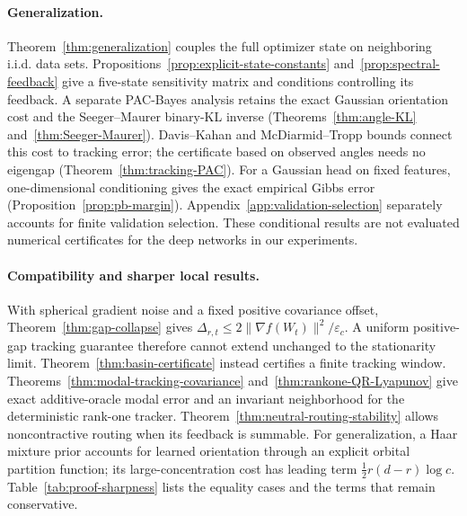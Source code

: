 \paragraph{Generalization.}
Theorem~\ref{thm:generalization} couples the full optimizer state on
neighboring i.i.d. data sets. Propositions~\ref{prop:explicit-state-constants}
and~\ref{prop:spectral-feedback} give a five-state sensitivity matrix and
conditions controlling its feedback. A separate PAC-Bayes analysis retains
the exact Gaussian orientation cost and the Seeger--Maurer binary-KL inverse
(Theorems~\ref{thm:angle-KL} and~\ref{thm:Seeger-Maurer}). Davis--Kahan and
McDiarmid--Tropp bounds connect this cost to tracking error; the certificate
based on observed angles needs no eigengap (Theorem~\ref{thm:tracking-PAC}).
For a Gaussian head on fixed features, one-dimensional conditioning gives
the exact empirical Gibbs error (Proposition~\ref{prop:pb-margin}).
Appendix~\ref{app:validation-selection} separately accounts for finite
validation selection. These conditional results are not evaluated numerical
certificates for the deep networks in our experiments.

\paragraph{Compatibility and sharper local results.}
With spherical gradient noise and a fixed positive covariance offset,
Theorem~\ref{thm:gap-collapse} gives
$\Delta_{r,t}\le2\|\nabla f(W_t)\|^2/\varepsilon_c$.
A uniform positive-gap tracking guarantee therefore cannot extend unchanged
to the stationarity limit. Theorem~\ref{thm:basin-certificate} instead
certifies a finite tracking window. Theorems~\ref{thm:modal-tracking-covariance}
and~\ref{thm:rankone-QR-Lyapunov} give exact additive-oracle modal error and
an invariant neighborhood for the deterministic rank-one tracker.
Theorem~\ref{thm:neutral-routing-stability} allows noncontractive routing
when its feedback is summable. For generalization, a Haar mixture prior
accounts for learned orientation through an explicit orbital partition
function; its large-concentration cost has leading term
$\tfrac12r(d-r)\log c$. Table~\ref{tab:proof-sharpness} lists the equality
cases and the terms that remain conservative.
